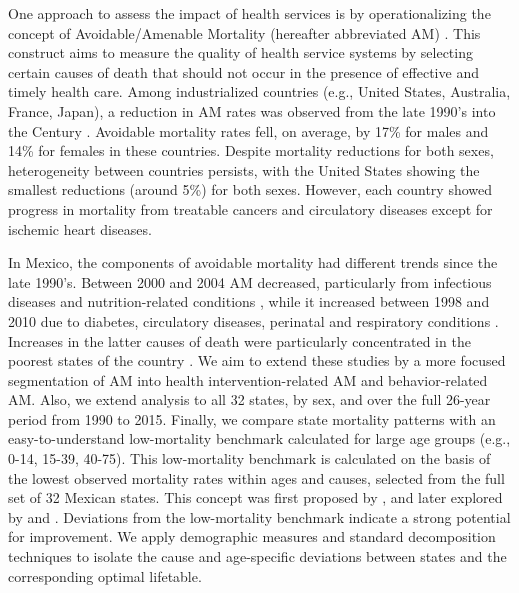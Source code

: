 \documentclass{article}
\begin{document}
\begin{spacing}{1.5}
 
 
 One approach to assess the impact of health services is by operationalizing the
 concept of Avoidable/Amenable Mortality (hereafter abbreviated AM)
 \citep{nolte&mckee2004, nolte&mckee2008}. This construct aims to measure the quality of health service systems by selecting certain
 causes of death that should not occur in the presence of effective and
 timely health care. Among industrialized countries (e.g., United States,
 Australia, France, Japan), a reduction in AM rates was
 observed from the late 1990's into the  Century
 \citep{nolte&mckee2008}. Avoidable mortality rates fell, on average, by 17\%
 for males and 14\% for females in these countries. Despite mortality reductions for
 both sexes, heterogeneity between countries persists, with the United
 States showing the smallest reductions (around 5\%) for both sexes. However,
 each country showed progress in mortality from treatable cancers and
 circulatory diseases except for ischemic heart diseases.

In Mexico, the components of avoidable mortality had different trends since the
late 1990's. Between 2000 and 2004 AM decreased, particularly from
infectious diseases and nutrition-related conditions \citep{francomarina2006}, while it increased between 1998 and 2010 due to diabetes, circulatory diseases, perinatal and respiratory conditions
\citep{agudelo2014efecto}. Increases in the latter causes
of death were particularly concentrated in the poorest states of the country
\citep{davila2014mortalidad}. We aim to extend these studies
by a more focused segmentation of AM into health intervention-related AM and
behavior-related AM. Also, we extend analysis to all 32 states, by sex, and over
the full 26-year period from 1990 to 2015. Finally, we compare state mortality patterns
with an easy-to-understand low-mortality benchmark calculated for large age
groups (e.g., 0-14, 15-39, 40-75).
This low-mortality benchmark is calculated on the basis of the lowest observed
mortality rates within ages and causes, selected from the full set of 32 Mexican
states.
This concept was first proposed by \citet{whelpton1947}, and later explored by 
\citet{wunsch1975minimum} and \citet{vallin2008minimum}. Deviations from the
low-mortality benchmark indicate a strong potential for improvement. We apply
demographic measures and standard decomposition techniques to isolate the cause
and age-specific deviations between states and the corresponding optimal
lifetable.


\end{spacing}
\end{document}
